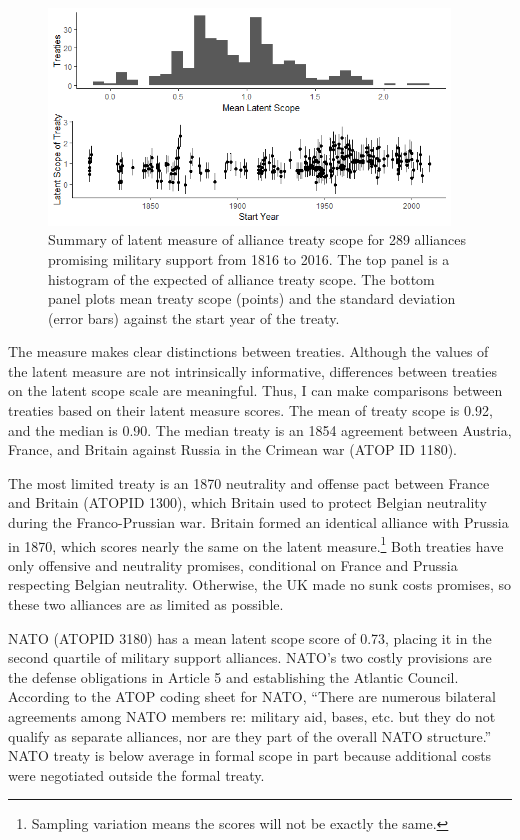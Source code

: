 \documentclass[12pt]{article}
\begin{document}
\begin{figure}
	\centering
		\includegraphics[width=0.95\textwidth]{../figures/ls-summary.png}
	\caption{Summary of latent measure of alliance treaty scope for 289 alliances promising military support from 1816 to 2016. The top panel is a histogram of the expected of alliance treaty scope. The bottom panel plots mean treaty scope (points) and the standard deviation (error bars) against the start year of the treaty.}
	\label{fig:ls-summary}
\end{figure}


The measure makes clear distinctions between treaties. 
Although the values of the latent measure are not intrinsically informative, differences between treaties on the latent scope scale are meaningful. 
Thus, I can make comparisons between treaties based on their latent measure scores. 
The mean of treaty scope is 0.92, and the median is 0.90. 
The median treaty is an 1854 agreement between Austria, France, and Britain against Russia in the Crimean war (ATOP ID 1180). 


The most limited treaty is an 1870 neutrality and offense pact between France and Britain (ATOPID 1300), which Britain used to protect Belgian neutrality during the Franco-Prussian war.  
Britain formed an identical alliance with Prussia in 1870, which scores nearly the same on the latent measure.\footnote{
Sampling variation means the scores will not be exactly the same.} 
Both treaties have only offensive and neutrality promises, conditional on France and Prussia respecting Belgian neutrality. 
Otherwise, the UK made no sunk costs promises, so these two alliances are as limited as possible. 


NATO (ATOPID 3180) has a mean latent scope score of 0.73, placing it in the second quartile of military support alliances. 
NATO's two costly provisions are the defense obligations in Article 5 and establishing the Atlantic Council. 
According to the ATOP coding sheet for NATO, ``There are numerous bilateral agreements among NATO members re: military aid, bases, etc. but they do not qualify as separate alliances, nor are they part of the overall NATO structure.''
NATO treaty is below average in formal scope in part because additional costs were negotiated outside the formal treaty.    
\end{document}
